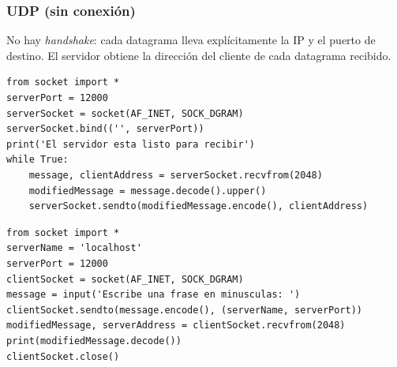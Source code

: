 \documentclass[11pt,a4paper]{article}
\begin{document}
\subsubsection{UDP (sin conexión)}

No hay \emph{handshake}: cada datagrama lleva explícitamente la IP y el puerto de destino. El servidor obtiene la dirección del cliente de cada datagrama recibido.

\begin{center}
\end{center}

\begin{lstlisting}[language=pyr,caption={UDPServer.py}]
from socket import *
serverPort = 12000
serverSocket = socket(AF_INET, SOCK_DGRAM)
serverSocket.bind(('', serverPort))
print('El servidor esta listo para recibir')
while True:
    message, clientAddress = serverSocket.recvfrom(2048)
    modifiedMessage = message.decode().upper()
    serverSocket.sendto(modifiedMessage.encode(), clientAddress)
\end{lstlisting}

\begin{lstlisting}[language=pyr,caption={UDPClient.py}]
from socket import *
serverName = 'localhost'
serverPort = 12000
clientSocket = socket(AF_INET, SOCK_DGRAM)
message = input('Escribe una frase en minusculas: ')
clientSocket.sendto(message.encode(), (serverName, serverPort))
modifiedMessage, serverAddress = clientSocket.recvfrom(2048)
print(modifiedMessage.decode())
clientSocket.close()
\end{lstlisting}
\end{document}
